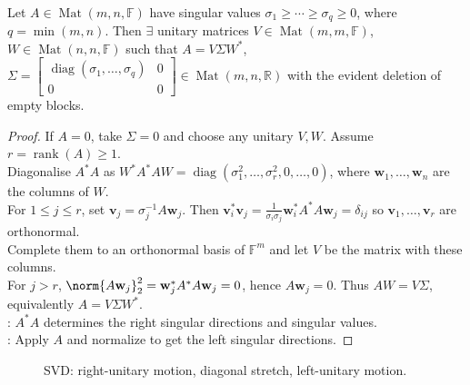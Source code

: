 \begin{theorem} \label{thm:matrix-singular-value-decomposition} \\
Let $A\in\operatorname{Mat}(m,n,\mathbb{F})$ have singular values $\sigma_1\geq\cdots\geq\sigma_q\geq0$, where $q=\min(m,n)$. Then $\exists$ unitary matrices $V\in\operatorname{Mat}(m,m,\mathbb{F})$, $W\in\operatorname{Mat}(n,n,\mathbb{F})$ such that $A=V\Sigma W^*$, $\Sigma=
\begin{bmatrix}
\operatorname{diag}(\sigma_1,\ldots,\sigma_q) & 0\\
0 & 0
\end{bmatrix}
\in\operatorname{Mat}(m,n,\mathbb{R})$
with the evident deletion of empty blocks.
\begin{proof}
If $A=0$, take $\Sigma=0$ and choose any unitary $V,W$. Assume $r=\operatorname{rank}(A)\geq1$.\\
Diagonalise $A^*A$ as $W^*A^*AW=\operatorname{diag}(\sigma_1^2,\ldots,\sigma_r^2,0,\ldots,0)$, where $\mathbf{w}_1,\ldots,\mathbf{w}_n$ are the columns of $W$.\\
For $1\leq j\leq r$, set $\mathbf{v}_j=\sigma_j^{-1}A\mathbf{w}_j$. Then $\mathbf{v}_i^*\mathbf{v}_j =\frac{1}{\sigma_i\sigma_j}\mathbf{w}_i^*A^*A\mathbf{w}_j =\delta_{ij}$ so $\mathbf{v}_1,\ldots,\mathbf{v}_r$ are orthonormal.\\
Complete them to an orthonormal basis of $\mathbb{F}^m$ and let $V$ be the matrix with these columns.\\
For $j>r$, $\norm{A\mathbf{w}_j}_2^2=\mathbf{w}_j^*A^*A\mathbf{w}_j=0$, hence $A\mathbf{w}_j=0$. Thus $AW=V\Sigma$, equivalently $A=V\Sigma W^*$.\\
: $A^*A$ determines the right singular directions and singular values.\\
: Apply $A$ and normalize to get the left singular directions.
\end{proof}
\end{theorem}

\begin{figure}[H]
  \centering
  
  \caption{SVD: right-unitary motion, diagonal stretch, left-unitary motion.}
  \label{fig:matrix-svd-unit-ball-to-ellipse}
\end{figure}

